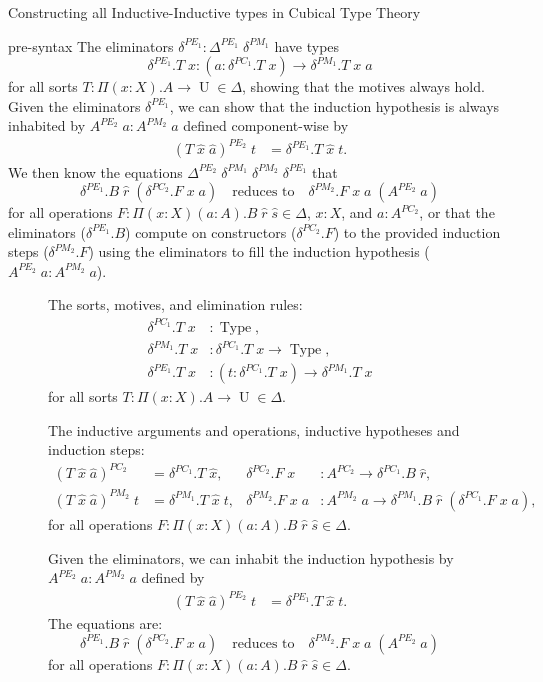 \documentclass[runningheads]{llncs}
\DeclareMathOperator{\USet}{Type}
\DeclareMathOperator{\UU}{U}
\begin{document}
{\begin{section}{Constructing all Inductive-Inductive types in Cubical Type Theory}
\begin{subsection}{pre-syntax}
The eliminators $\delta^{PE_1} : \Delta^{PE_1}\;\delta^{PM_1}$ have types \[\delta^{PE_1}.T\;x : (a : \delta^{PC_1}.T\;x) \to \delta^{PM_1}.T\;x\;a\] for all sorts $T : \Pi(x : X).A\to\UU \in\Delta$, showing that the motives always hold. Given the eliminators $\delta^{PE_1}$, we can show that the induction hypothesis is always inhabited by $A^{PE_2}\;a : A^{PM_2}\;a$ defined component-wise by \begin{align*}(T\;\hat{x}\;\hat{a})^{PE_2}\;t &= \delta^{PE_1}.T\;\hat{x}\;t.\end{align*} We then know the equations $\Delta^{PE_2}\;\delta^{PM_1}\;\delta^{PM_2}\;\delta^{PE_1}$ that \[\delta^{PE_1}.B\;\hat{r}\;(\delta^{PC_2}.F\;x\;a)\quad\text{reduces to}\quad \delta^{PM_2}.F\;x\;a\;(A^{PE_2}\;a)\] for all operations $F : \Pi(x : X)(a : A).B\;\hat{r}\;\hat{s} \in \Delta$, $x : X$, and $a : A^{PC_2}$, or that the eliminators ($\delta^{PE_1}.B$) compute on constructors ($\delta^{PC_2}.F$) to the provided induction steps ($\delta^{PM_2}.F$) using the eliminators to fill the induction hypothesis ($A^{PE_2}\;a : A^{PM_2}\;a$).

\begin{figure}[htpb]
    \begin{flushleft}
    The sorts, motives, and elimination rules:
    \begin{align*}
    \delta^{PC_1}.T\;x &: \USet,\\
    \delta^{PM_1}.T\;x &: \delta^{PC_1}.T\;x \to \USet,\\
    \delta^{PE_1}.T\;x &: (t : \delta^{PC_1}.T\;x) \to \delta^{PM_1}.T\;x
    \end{align*}
    for all sorts $T : \Pi(x : X).A\to\UU \in\Delta$.
    
    The inductive arguments and operations, inductive hypotheses and induction steps:
    \begin{align*}
    (T\;\hat{x}\;\hat{a})^{PC_2} &= \delta^{PC_1}.T\;\hat{x},
    &\delta^{PC_2}.F\;x &: A^{PC_2} \to \delta^{PC_1}.B\;\hat{r},\\
    (T\;\hat{x}\;\hat{a})^{PM_2}\;t &= \delta^{PM_1}.T\;\hat{x}\;t,
    &\delta^{PM_2}.F\;x\;a &: A^{PM_2}\;a \to \delta^{PM_1}.B\;\hat{r}\;(\delta^{PC_1}.F\;x\;a),
    \end{align*}
    for all operations $F : \Pi(x : X)(a : A).B\;\hat{r}\;\hat{s} \in \Delta$.
    
    Given the eliminators, we can inhabit the induction hypothesis by $A^{PE_2}\;a : A^{PM_2}\;a$ defined by
    \begin{align*}
    (T\;\hat{x}\;\hat{a})^{PE_2}\;t &= \delta^{PE_1}.T\;\hat{x}\;t.
    \end{align*}
    The equations are:
    \[\delta^{PE_1}.B\;\hat{r}\;(\delta^{PC_2}.F\;x\;a)\quad\text{reduces to}\quad \delta^{PM_2}.F\;x\;a\;(A^{PE_2}\;a)\]
    for all operations $F : \Pi(x : X)(a : A).B\;\hat{r}\;\hat{s} \in \Delta$.
    

\end{flushleft}
\end{figure}
\end{subsection}
\end{section}}
\end{document}
